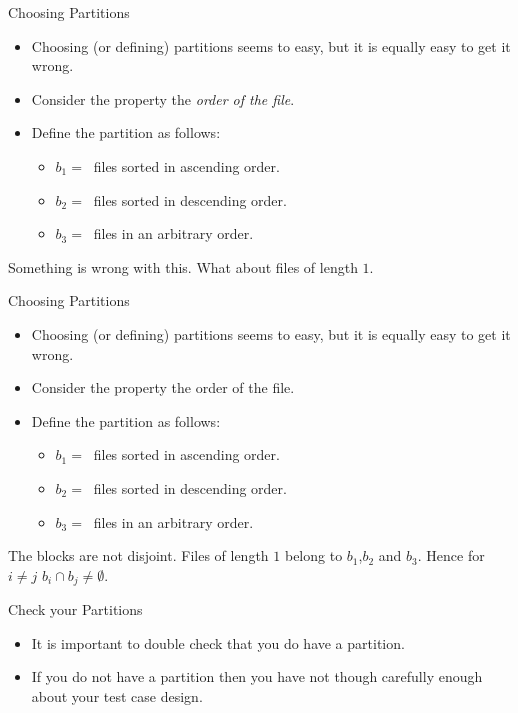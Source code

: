 \documentclass{beamer}
\begin{document}
\begin{frame}{Choosing Partitions}
  \begin{itemize}
  \item Choosing (or defining) partitions seems to easy, but it is
    equally easy to get it wrong.
  \item Consider the property the {\it order of the file}.
  \item Define the partition as follows:
    \begin{itemize}
    \item $b_1 = \ $ files sorted in ascending order.
    \item $b_2 = \ $ files sorted in descending order.
    \item $b_3 = \ $ files in an arbitrary order.
    \end{itemize}
  \end{itemize}
  Something is wrong with this. What about files of length $1$.
\end{frame}
\begin{frame}{Choosing Partitions}
  \begin{itemize}
  \item Choosing (or defining) partitions seems to easy, but it is
    equally easy to get it wrong.
  \item Consider the property the order of the file.
  \item Define the partition as follows:
    \begin{itemize}
    \item $b_1 = \ $ files sorted in ascending order.
    \item $b_2 = \ $ files sorted in descending order.
    \item $b_3 = \ $ files in an arbitrary order.
    \end{itemize}
  \end{itemize}
 The blocks are not disjoint. Files of length $1$ belong to
 $b_1$,$b_2$ and $b_3$. Hence for $i\neq j$ $b_i \cap b_j \neq \emptyset$.

\end{frame}
\begin{frame}{Check your Partitions}

  \begin{itemize}
  \item   It is important to double check that you do have a
    partition.
    \item If you  do not have a partition then you have not though
      carefully enough about your test case design.
  \end{itemize}

  
\end{frame}
\end{document}
